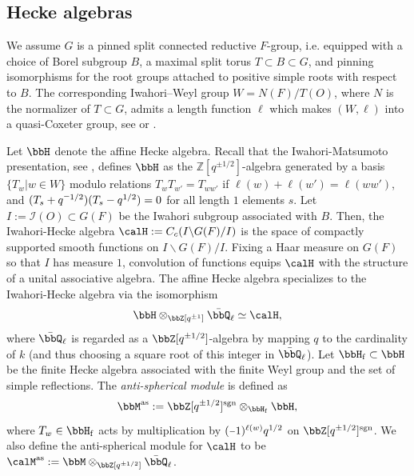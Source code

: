 \documentclass[10pt, reqno]{amsart}
\theoremstyle{plain}
\theoremstyle{definition}
\newcommand{\minus}{\scalebox{0.75}[1.0]{$-$}}
\numberwithin{equation}{section}
\begin{document}
	\subsection{Hecke algebras}
	We assume $G$ is a pinned split connected reductive $F$-group, i.e. equipped with a choice of Borel subgroup $B$, a maximal split torus $T\subset B\subset G$, and pinning isomorphisms for the root groups attached to positive simple roots with respect to $B$. The corresponding Iwahori--Weyl group $W=N(F)/T(O)$, where $N$ is the normalizer of $T \subset G$, admits a length function $\ell$ which makes $(W,\ell)$ into a quasi-Coxeter group, see \cite[page 7]{HR08} or \cite[Section 4.1.1]{AR}.
	
	
	Let $\bbH$ denote the affine Hecke algebra. Recall that the Iwahori-Matsumoto presentation, see \cite{IM65}, defines $\bbH$ as the $\mathbb{Z}[q^{\pm 1/2}]$-algebra generated by a basis $\{T_w \vert w\in W\}$ modulo relations $T_wT_{w'}=T_{ww'}$ if $\ell(w)+\ell(w')=\ell(ww')$, and $(T_{s}+q^{\minus 1/2})(T_s-q^{1/2})=0$ for all length $1$ elements $s$. Let $I:=\mathcal{I}(O)\subset G(F)$ be the Iwahori subgroup associated with $B$. Then, the Iwahori-Hecke algebra $\calH:=C_c(I\backslash G(F)/I)$ is the space of compactly
	supported smooth functions on $I\backslash G(F)/I$. Fixing a
	Haar measure on $G(F)$ so that $I$ has measure $1$, convolution of functions equips $\calH$ with the structure of a unital associative algebra. The affine Hecke algebra specializes to the Iwahori-Hecke algebra via the isomorphism
	$$
	\bbH\otimes_{\bbZ[q^{\pm 1}]}\bar\bbQ_\ell\simeq \calH,
	$$
	where $\bar \bbQ_\ell$ is regarded as a $\bbZ[q^{\pm 1/2}]$-algebra by mapping $q$ to the cardinality of $k$ (and thus choosing a square root of this integer in $\bar \bbQ_\ell$). Let $\bbH_\mathrm{f}\subset \bbH$ be the finite Hecke algebra associated with the finite Weyl group and the set of simple reflections. The \textit{anti-spherical module} is defined as $$
	\bbM^\mathrm{as}:=\bbZ[q^{\pm 1/2}]^\mathrm{sgn}\otimes_{\bbH_\mathrm{f}}\bbH,
	$$
	where $T_w\in \bbH_\mathrm{f}$ acts by multiplication by $(\minus 1)^{\ell({w})}q^{1/2}$ on $\bbZ[q^{\pm 1/2}]^\mathrm{sgn}$. We also define the anti-spherical module for $\calH$ to be $\calM^\mathrm{as}:=\bbM\otimes_{\bbZ[q^{\pm 1/2}]}\bar\bbQ_\ell $.
	
\end{document}
